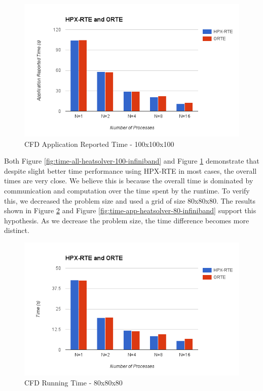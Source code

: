 \begin{figure}[h!]
  \centering
  \includegraphics[scale=0.7]{images/time-app-heatsolver-100-infiniband.png}
  \caption[CFD Application Reported Time - 100x100x100]{CFD Application Reported Time - 100x100x100}
  \label{fig:time-app-heatsolver-100-infiniband}
\end{figure}

Both Figure \ref{fig:time-all-heatsolver-100-infiniband} and Figure \ref{fig:time-app-heatsolver-100-infiniband} demonstrate that despite slight better time performance using HPX-RTE in most cases, the overall times are very close. We believe this is because the overall time is dominated by communication and computation over the time spent by the runtime. To verify this, we decreased the problem size and used a grid of size 80x80x80. The results shown in Figure \ref{fig:time-all-heatsolver-80-infiniband} and Figure \ref{fig:time-app-heatsolver-80-infiniband} support this hypothesis. As we decrease the problem size, the time difference becomes more distinct.

\begin{figure}[h!]
  \centering
  \includegraphics[scale=0.7]{images/time-all-heatsolver-80-infiniband.png}
  \caption[CFD Running Time - 80x80x80]{CFD Running Time - 80x80x80}
  \label{fig:time-all-heatsolver-80-infiniband}
\end{figure}

